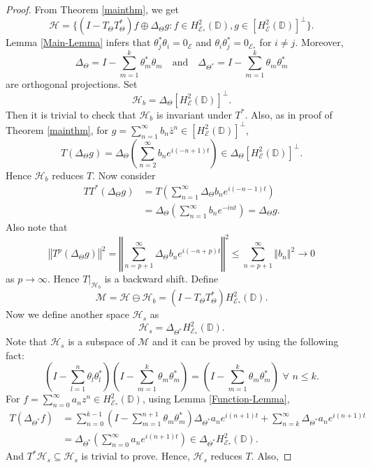 \documentclass[12pt]{amsart}
\newcommand{\cle}{\mathcal{E}}
\newcommand{\clh}{\mathcal{H}}
\newcommand{\clm}{\mathcal{M}}
\newcommand{\D}{\mathbb{D}}
\newcommand{\he}{{H}^2_\mathcal{E}(\mathbb{D})}
\theoremstyle{definition}
\theoremstyle{plain}
\theoremstyle{definition}
\numberwithin{equation}{section}
\begin{document}
\begin{proof}
From Theorem \ref{mainthm}, we get
\[
\clh=\{(I-T_\Theta T_\Theta^*)f \oplus\Delta_{\Theta} g: f \in H^2_{\cle_*}(\D), g \in [H^2_\cle(\D)]^\perp\}.
\]
Lemma \ref{Main-Lemma} infers that $\theta_j^*\theta_i=0_{\cle}$ and $\theta_i \theta_j^*=0_{\cle_*}$ for $i \neq j$. Moreover, 
\[
\Delta_{\Theta} = I-\sum\limits_{m=1}^k \theta_m^* \theta_m \quad \mbox{and} \quad \Delta_{\Theta^*}= I-\sum\limits_{m=1}^k \theta_m \theta_m^*
\]
are orthogonal projections. Set
\[
\clh_b=\Delta_{\Theta} [H^2_\cle(\D)]^\perp.
\]
Then it is trivial to check that $\clh_b$ is invariant under $T^*$. Also, as in proof of Theorem \ref{mainthm}, for $g=\sum\limits_{n=1}^{\infty} b_n\bar{z}^n \in [\he]^\perp$, 
\[
T\left(\Delta_{\Theta} g\right)=\Delta_{\Theta}\left(\sum\limits_{n=2}^{\infty} b_ne^{i(-n+1)t}\right) \in \Delta_{\Theta} [H^2_\cle(\D)]^\perp.
\]
Hence $\clh_b$ reduces $T$. 
Now consider 
\begin{align*}
TT^*\left(\Delta_{\Theta} g\right)&=T\left(\sum\limits_{n=1}^{\infty}\Delta_{\Theta}  b_ne^{i(-n-1)t}\right)\\
&=\Delta_{\Theta}\left(\sum\limits_{n=1}^{\infty}b_ne^{-int}\right)= \Delta_{\Theta} g.
\end{align*}
Also note that 
\[
\left\Vert T^p(\Delta_\Theta g)\right\Vert^2=\left\Vert\sum\limits_{n=p+1}^{\infty}\Delta_\Theta b_ne^{i(-n+p)t}\right\Vert^2  \leq  \sum\limits_{n=p+1}^{\infty}\left\Vert b_n\right\Vert^2 \rightarrow 0
\]
as $p \rightarrow \infty$. Hence $T|_{\clh_b}$ is a backward shift.
Define 
\[
\clm=\clh \ominus \clh_b =(I-T_\Theta T_\Theta^*)H^2_{\cle_*}(\D).
\]
Now we define another space $\clh_s$ as
\[
\clh_s=\Delta_{\Theta^*} H^2_{\cle_*}(\D).
\]
Note that $\clh_s$ is a subspace of $\clm$ and it can be proved by using the following fact:
\[
\left(I-\sum\limits_{l=1}^n \theta_l \theta_l^*\right)\left( I-\sum\limits_{m=1}^k \theta_m \theta_m^*\right)=\left( I-\sum\limits_{m=1}^k \theta_m \theta_m^* \right)\,\, \forall \,\, n\leq k.
\]
For $f=\sum\limits_{n=0}^\infty a_nz^n \in H^2_{\cle_*}(\D)$, using Lemma \ref{Function-Lemma},
\begin{align*}
T(\Delta_{\Theta^*} f)&=\sum\limits_{n=0}^{k-1} \left( I-\sum\limits_{m=1}^{n+1} \theta_m \theta_m^* \right)\Delta_{\Theta^*}a_ne^{i(n+1)t}+\sum\limits_{n=k}^\infty\Delta_{\Theta^*} a_ne^{i(n+1)t}\\
&=\Delta_{\Theta^*}\left(\sum\limits_{n=0}^\infty a_n e^{i(n+1)t}\right) \in \Delta_{\Theta^*} H^2_{\cle_*}(\D).
\end{align*}
And $T^*\clh_s \subseteq \clh_s$ is trivial to prove. Hence, $\clh_s$ reduces $T$. Also,

\end{proof}
\end{document}

